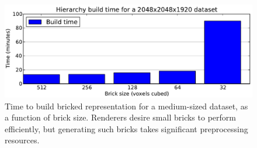 \begin{figure}[tb]
  \centering
  \includegraphics[width=0.98\linewidth]{images/rg/HierarchyBuildTime.pdf}
  \caption{Time to build bricked representation for a medium-sized dataset,
  as a function of brick size.  Renderers desire small bricks to
  perform efficiently, but generating such bricks takes significant
  preprocessing resources.}
  \label{figrg:hierarchy-build}
\end{figure}


